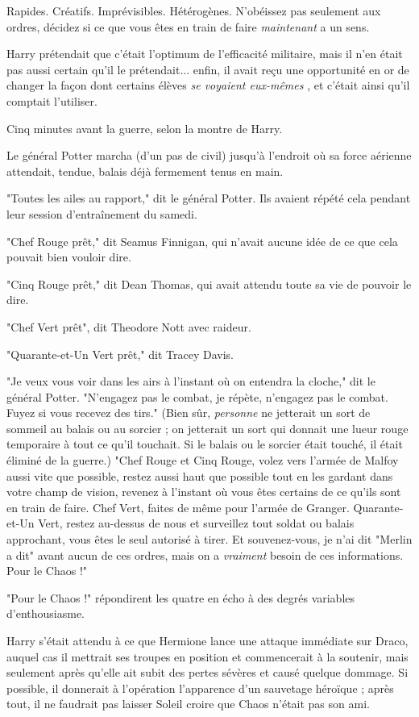 Rapides. Créatifs. Imprévisibles. Hétérogènes. N'obéissez pas seulement aux ordres, décidez si ce que vous êtes en train de faire \emph{maintenant}  a un sens.

Harry prétendait que c'était l'optimum de l'efficacité militaire, mais il n'en était pas aussi certain qu'il le prétendait... enfin, il avait reçu une opportunité en or de changer la façon dont certains élèves \emph{se voyaient eux-mêmes} , et c'était ainsi qu'il comptait l'utiliser.

Cinq minutes avant la guerre, selon la montre de Harry.

Le général Potter marcha (d'un pas de civil) jusqu'à l'endroit où sa force aérienne attendait, tendue, balais déjà fermement tenus en main.

"Toutes les ailes au rapport," dit le général Potter. Ils avaient répété cela pendant leur session d'entraînement du samedi.

"Chef Rouge prêt," dit Seamus Finnigan, qui n'avait aucune idée de ce que cela pouvait bien vouloir dire.

"Cinq Rouge prêt," dit Dean Thomas, qui avait attendu toute sa vie de pouvoir le dire.

"Chef Vert prêt", dit Theodore Nott avec raideur.

"Quarante-et-Un Vert prêt," dit Tracey Davis.

"Je veux vous voir dans les airs à l'instant où on entendra la cloche," dit le général Potter. "N'engagez pas le combat, je répète, n'engagez pas le combat. Fuyez si vous recevez des tirs." (Bien sûr, \emph{personne}  ne jetterait un sort de sommeil au balais ou au sorcier ; on jetterait un sort qui donnait une lueur rouge temporaire à tout ce qu'il touchait. Si le balais ou le sorcier était touché, il était éliminé de la guerre.) "Chef Rouge et Cinq Rouge, volez vers l'armée de Malfoy aussi vite que possible, restez aussi haut que possible tout en les gardant dans votre champ de vision, revenez à l'instant où vous êtes certains de ce qu'ils sont en train de faire. Chef Vert, faites de même pour l'armée de Granger. Quarante-et-Un Vert, restez au-dessus de nous et surveillez tout soldat ou balais approchant, vous êtes le seul autorisé à tirer. Et souvenez-vous, je n'ai dit "Merlin a dit" avant aucun de ces ordres, mais on a \emph{vraiment}  besoin de ces informations. Pour le Chaos !"

"Pour le Chaos !" répondirent les quatre en écho à des degrés variables d'enthousiasme.

Harry s'était attendu à ce que Hermione lance une attaque immédiate sur Draco, auquel cas il mettrait ses troupes en position et commencerait à la soutenir, mais seulement après qu'elle ait subit des pertes sévères et causé quelque dommage. Si possible, il donnerait à l'opération l'apparence d'un sauvetage héroïque ; après tout, il ne faudrait pas laisser Soleil croire que Chaos n'était pas son ami.

